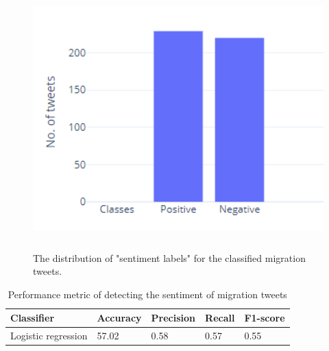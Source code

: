 \begin{figure}
	\centering
	\includegraphics[width=12cm\linewidth,height=10cm]{thesis_template/images/sentiment_of_migration_tweets.png}
	\caption{ The distribution of "sentiment labels" for the classified migration tweets.}
	\label{fig:sent_migration_distribution}
\end{figure}

\begin{table}[]
\centering
\begin{tabular}{lllll}
\hline
\textbf{Classifier} & \textbf{Accuracy} & \textbf{Precision} & \textbf{Recall} & \textbf{F1-score} \\ \hline
Logistic regression & 57.02             & 0.58              & 0.57          & 0.55              \\ \hline

\end{tabular}
\caption{Performance metric of detecting the sentiment of migration tweets}
\label{tab:sentiment_of_Migration_metric}
\end{table}